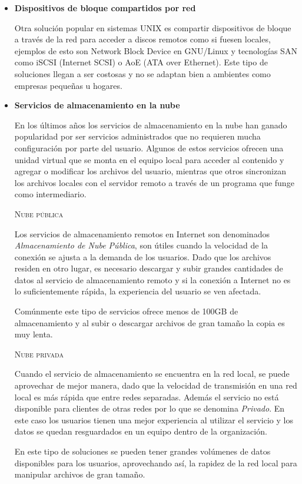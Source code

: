 \begin{itemize}
      \item \textbf{Dispositivos de bloque compartidos por red}

Otra soluci\'{o}n popular en sistemas \textsc{UNIX} es compartir dispositivos de bloque a trav\'{e}s de la red para acceder a discos remotos como si fuesen locales, ejemplos de esto son Network Block Device en GNU/Linux y tecnolog\'{i}as \textsc{SAN} como iSCSI (Internet SCSI) o AoE (ATA over Ethernet). Este tipo de soluciones llegan a ser costosas y no se adaptan bien a ambientes como empresas peque\~{n}as u hogares.

      \item \textbf{Servicios de almacenamiento en la nube}

En los \'{u}ltimos a\~{n}os los servicios de almacenamiento en la nube han ganado popularidad por ser servicios administrados que no requieren mucha configuraci\'{o}n por parte del usuario. Algunos de estos servicios ofrecen una unidad virtual que se monta en el equipo local para acceder al contenido y agregar o modificar los archivos del usuario, mientras que otros sincronizan los archivos locales con el servidor remoto a trav\'{e}s de un programa que funge como intermediario.

        \textsc{Nube p\'{u}blica}

Los servicios de almacenamiento remotos en Internet son denominados \emph{Almacenamiento de Nube P\'{u}blica}, son \'{u}tiles cuando la velocidad de la conexi\'{o}n se ajusta a la demanda de los usuarios. Dado que los archivos residen en otro lugar, es necesario descargar y subir grandes cantidades de datos al servicio de almacenamiento remoto y si la conexi\'{o}n a Internet no es lo suficientemente r\'{a}pida, la experiencia del usuario se ven afectada.

Com\'{u}nmente este tipo de servicios ofrece menos de 100GB de almacenamiento y al subir o descargar archivos de gran tama\~{n}o la copia es muy lenta.

        \textsc{Nube privada}

Cuando el servicio de almacenamiento se encuentra en la red local, se puede aprovechar de mejor manera, dado que la velocidad de transmisi\'{o}n en una red local es m\'{a}s r\'{a}pida que entre redes separadas. Adem\'{a}s el servicio no est\'{a} disponible para clientes de otras redes por lo que se denomina \emph{Privado}. En este caso los usuarios tienen una mejor experiencia al utilizar el servicio y los datos se quedan resguardados en un equipo dentro de la organizaci\'{o}n.

En este tipo de soluciones se pueden tener grandes vol\'{u}menes de datos disponibles para los usuarios, aprovechando as\'{i}, la rapidez de la red local para manipular archivos de gran tama\~{n}o.

    \end{itemize}

